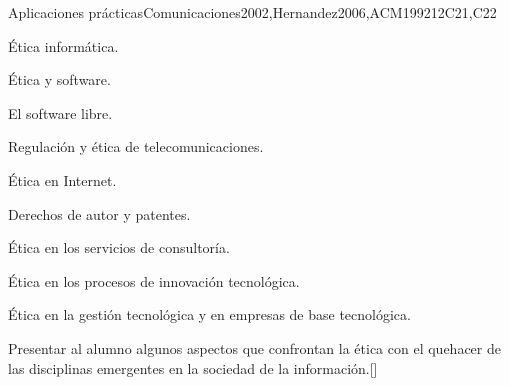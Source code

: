 \begin{syllabus}
\begin{unit}{}{Aplicaciones prácticas}{Comunicaciones2002,Hernandez2006,ACM1992}{12}{C21,C22}
\begin{topics}
    \item Ética informática.
	\begin{subtopics}
	    \item Ética y software.
	    \item El software libre.
	\end{subtopics}
    \item Regulación y ética de telecomunicaciones.
	\begin{subtopics}
	    \item Ética en Internet.
	\end{subtopics}
    \item Derechos de autor y patentes.
    \item Ética en los servicios de consultoría.
    \item Ética en los procesos de innovación tecnológica.
    \item Ética en la gestión tecnológica y en empresas de base tecnológica.
\end{topics}
\begin{learningoutcomes}
	\item Presentar al alumno algunos aspectos que confrontan la ética con el quehacer de las disciplinas emergentes en la sociedad de la información.[\Familiarity]
\end{learningoutcomes}
\end{unit}

\begin{coursebibliography}
\end{coursebibliography}

\end{syllabus}

